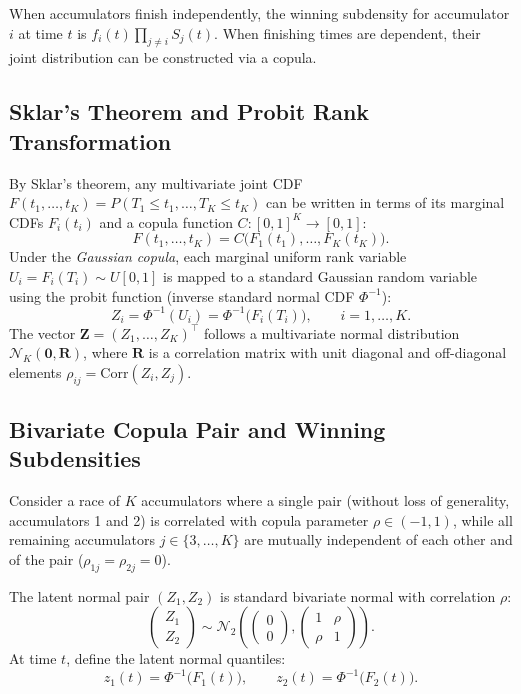 \documentclass[12pt]{article}
\newcommand{\Normal}{\mathcal{N}}
\newcommand{\PhiN}{\Phi}
\begin{document}
When accumulators finish independently, the winning subdensity for accumulator $i$ at time $t$ is $f_i(t) \prod_{j \ne i} S_j(t)$. When finishing times are dependent, their joint distribution can be constructed via a copula.

\subsection{Sklar's Theorem and Probit Rank Transformation}
By Sklar's theorem, any multivariate joint CDF $F(t_1, \dots, t_K) = P(T_1 \le t_1, \dots, T_K \le t_K)$ can be written in terms of its marginal CDFs $F_i(t_i)$ and a copula function $C : [0, 1]^K \to [0, 1]$:
\begin{equation}
  F(t_1, \dots, t_K) = C\Big(F_1(t_1), \dots, F_K(t_K)\Big).
\end{equation}
Under the \emph{Gaussian copula}, each marginal uniform rank variable $U_i = F_i(T_i) \sim U[0, 1]$ is mapped to a standard Gaussian random variable using the probit function (inverse standard normal CDF $\PhiN^{-1}$):
\begin{equation}
  Z_i = \PhiN^{-1}(U_i) = \PhiN^{-1}\big(F_i(T_i)\big), \qquad i = 1, \dots, K.
\end{equation}
The vector $\mathbf{Z} = (Z_1, \dots, Z_K)^\top$ follows a multivariate normal distribution $\Normal_K(\mathbf{0}, \mathbf{R})$, where $\mathbf{R}$ is a correlation matrix with unit diagonal and off-diagonal elements $\rho_{ij} = \mathrm{Corr}(Z_i, Z_j)$.

\subsection{Bivariate Copula Pair and Winning Subdensities}
Consider a race of $K$ accumulators where a single pair (without loss of generality, accumulators 1 and 2) is correlated with copula parameter $\rho \in (-1, 1)$, while all remaining accumulators $j \in \{3, \dots, K\}$ are mutually independent of each other and of the pair ($\rho_{1j} = \rho_{2j} = 0$).

The latent normal pair $(Z_1, Z_2)$ is standard bivariate normal with correlation $\rho$:
\begin{equation}
  \begin{pmatrix} Z_1 \\ Z_2 \end{pmatrix} \sim \Normal_2\!\left(\begin{pmatrix} 0 \\ 0 \end{pmatrix}, \begin{pmatrix} 1 & \rho \\ \rho & 1 \end{pmatrix}\right).
\end{equation}
At time $t$, define the latent normal quantiles:
\begin{equation}
  z_1(t) = \PhiN^{-1}\big(F_1(t)\big), \qquad z_2(t) = \PhiN^{-1}\big(F_2(t)\big).
\end{equation}
\end{document}
